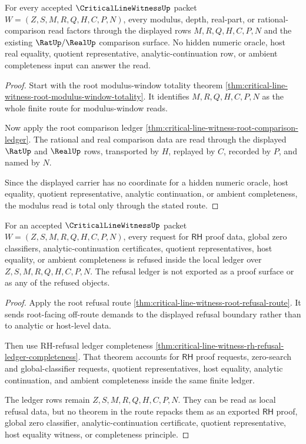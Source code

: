 \begin{theorem}
\label{thm:critical-line-witness-root-modulus-read-totality}
For every accepted $\CriticalLineWitnessUp$ packet $W=(Z,S,M,R,Q,H,C,P,N)$, every modulus, depth, real-part, or rational-comparison read factors through the displayed rows $M,R,Q,H,C,P,N$ and the existing $\RatUp/\RealUp$ comparison surface. No hidden numeric oracle, host real equality, quotient representative, analytic-continuation row, or ambient completeness input can answer the read.
\end{theorem}
\begin{proof}
Start with the root modulus-window totality theorem \autoref{thm:critical-line-witness-root-modulus-window-totality}. It identifies $M,R,Q,H,C,P,N$ as the whole finite route for modulus-window reads.

Now apply the root comparison ledger \autoref{thm:critical-line-witness-root-comparison-ledger}. The rational and real comparison data are read through the displayed $\RatUp$ and $\RealUp$ rows, transported by $H$, replayed by $C$, recorded by $P$, and named by $N$.

Since the displayed carrier has no coordinate for a hidden numeric oracle, host equality, quotient representative, analytic continuation, or ambient completeness, the modulus read is total only through the stated route.
\end{proof}

\begin{theorem}
\label{thm:critical-line-witness-root-refusal-ledger-scope}
For an accepted $\CriticalLineWitnessUp$ packet $W=(Z,S,M,R,Q,H,C,P,N)$, every request for $\mathsf{RH}$ proof data, global zero classifiers, analytic-continuation certificates, quotient representatives, host equality, or ambient completeness is refused inside the local ledger over $Z,S,M,R,Q,H,C,P,N$. The refusal ledger is not exported as a proof surface or as any of the refused objects.
\end{theorem}
\begin{proof}
Apply the root refusal route \autoref{thm:critical-line-witness-root-refusal-route}. It sends root-facing off-route demands to the displayed refusal boundary rather than to analytic or host-level data.

Then use RH-refusal ledger completeness \autoref{thm:critical-line-witness-rh-refusal-ledger-completeness}. That theorem accounts for $\mathsf{RH}$ proof requests, zero-search and global-classifier requests, quotient representatives, host equality, analytic continuation, and ambient completeness inside the same finite ledger.

The ledger rows remain $Z,S,M,R,Q,H,C,P,N$. They can be read as local refusal data, but no theorem in the route repacks them as an exported $\mathsf{RH}$ proof, global zero classifier, analytic-continuation certificate, quotient representative, host equality witness, or completeness principle.
\end{proof}
